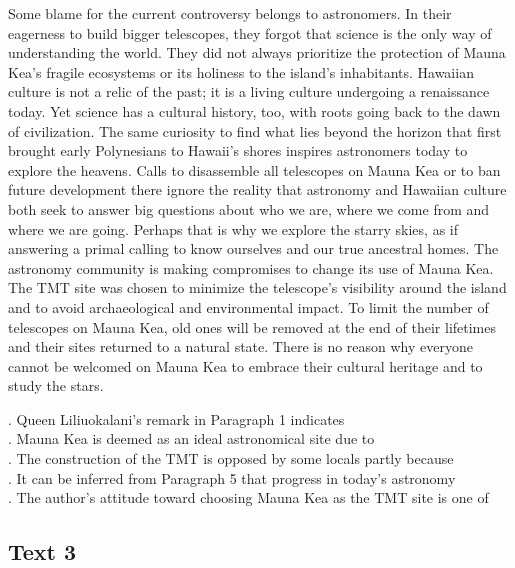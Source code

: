 Some blame for the current controversy belongs to astronomers. In their eagerness to build bigger telescopes, they forgot that science is the only way of understanding the world. They did not always prioritize the protection of Mauna Kea’s fragile ecosystems or its holiness to the island’s inhabitants. Hawaiian culture is not a relic of the past; it is a living culture undergoing a renaissance today. 
Yet science has a cultural history, too, with roots going back to the dawn of civilization. The same curiosity to find what lies beyond the horizon that first brought early Polynesians to Hawaii’s shores inspires astronomers today to explore the heavens. Calls to disassemble all telescopes on Mauna Kea or to ban future development there ignore the reality that astronomy and Hawaiian culture both seek to answer big questions about who we are, where we come from and where we are going. Perhaps that is why we explore the starry skies, as if answering a primal calling to know ourselves and our true ancestral homes. 
The astronomy community is making compromises to change its use of Mauna Kea. The TMT site was chosen to minimize the telescope’s visibility around the island and to avoid archaeological and environmental impact. To limit the number of telescopes on Mauna Kea, old ones will be removed at the end of their lifetimes and their sites returned to a natural state. There is no reason why everyone cannot be welcomed on Mauna Kea to embrace their cultural heritage and to study the stars. 
\begin{questions} . Queen Liliuokalani’s remark in Paragraph 1 indicates 
\\ . Mauna Kea is deemed as an ideal astronomical site due to 
\\ . The construction of the TMT is opposed by some locals partly because 
\\ . It can be inferred from Paragraph 5 that progress in today’s astronomy 
\\ . The author’s attitude toward choosing Mauna Kea as the TMT site is one of 
\\ \end{questions}      \subsection{Text 3} 
